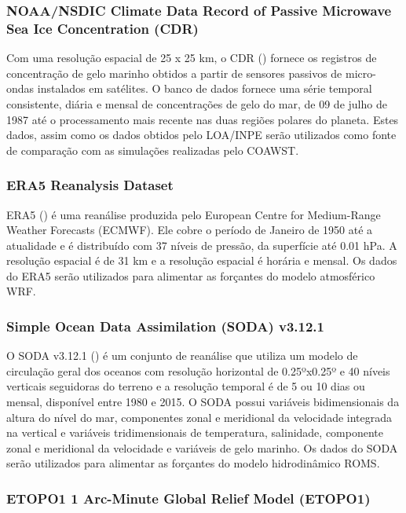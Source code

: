 \documentclass{article}
\begin{document}
\subsubsection{NOAA/NSDIC Climate Data Record of Passive Microwave Sea Ice Concentration (CDR)}
\bigskip

Com uma resolução espacial de 25 x 25 km, o CDR (\cite{Peng2013}) fornece os registros de concentração de gelo marinho obtidos a partir de sensores passivos de micro-ondas instalados em satélites. O banco de dados
fornece uma série temporal consistente, diária e mensal de concentrações de gelo do mar, de 09 de julho de 1987 até o processamento mais recente nas duas
regiões polares do planeta. Estes dados, assim como os dados obtidos pelo LOA/INPE serão utilizados como fonte de comparação com as simulações realizadas pelo 
COAWST.

\subsubsection{ERA5 Reanalysis Dataset}
\bigskip

ERA5 (\cite{ERA5}) é uma reanálise produzida pelo European Centre for Medium-Range Weather Forecasts (ECMWF). Ele cobre o período
de Janeiro de 1950 até a atualidade e é distribuído com 37 níveis de pressão, da superfície até 0.01 hPa. A resolução
espacial é de 31 km e a resolução espacial é horária e mensal. Os dados do ERA5 serão utilizados para alimentar as forçantes do modelo atmosférico WRF.

\subsubsection{Simple Ocean Data Assimilation (SODA) v3.12.1}
\bigskip

O SODA v3.12.1 (\cite{Carton2018}) é um conjunto de reanálise que utiliza
um modelo de circulação geral dos oceanos com resolução horizontal de 0.25ºx0.25º e 40 níveis verticais seguidoras
do terreno e a resolução temporal é de 5 ou 10 dias ou mensal, disponível entre 1980 e 2015.
O SODA possui variáveis bidimensionais da altura do nível do mar, componentes zonal e meridional da 
velocidade integrada na vertical e variáveis tridimensionais de temperatura, salinidade, componente zonal e meridional
da velocidade e variáveis de gelo marinho. Os dados do SODA serão utilizados para alimentar as forçantes do modelo hidrodinâmico ROMS.

\subsubsection{ETOPO1 1 Arc-Minute Global Relief Model (ETOPO1)}
\bigskip
\end{document}
